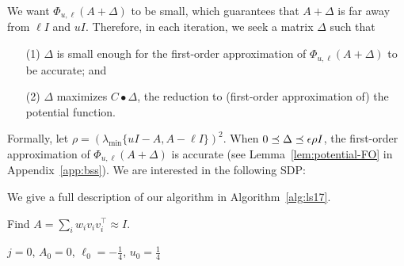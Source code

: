 We want $\Phi_{u,\ell}(A+\Delta)$ to be small, which guarantees that $A+\Delta$ is far away from $\ell I$ and $u I$.
Therefore, in each iteration, we seek a matrix $\Delta$ such that
\begin{enumerate}
\item[(1)] $\Delta$ is small enough for the first-order approximation of $\Phi_{u,\ell}(A+\Delta)$ to be accurate; and
\item[(2)] $\Delta$ maximizes $C \bullet \Delta$, the reduction to (first-order approximation of) the potential function.
\end{enumerate}

Formally, let $\rho = (\lambda_{\min}\{u I - A, A - \ell I\})^2$.
When $0 \preceq \Delta \preceq \epsilon \rho I$, the first-order approximation of $\Phi_{u,\ell}(A+\Delta)$  is accurate (see Lemma~\ref{lem:potential-FO} in Appendix~\ref{app:bss}).
We are interested in the following SDP:
\begin{lp}
\label{eqn:sdp-oracle}
\st {}
\end{lp}


We give a full description of our algorithm in Algorithm~\ref{alg:ls17}.

\begin{algorithm2e}
  \caption{Find $A = \sum_i w_i v_i v_i^\top \approx I$.}
  \label{alg:ls17}
  \SetAlgoVlined
  $j = 0$, $A_0 = 0$, $\ell_0 = -\frac{1}{4}$, $u_0 = \frac{1}{4}$\; 
  \;
\end{algorithm2e}

